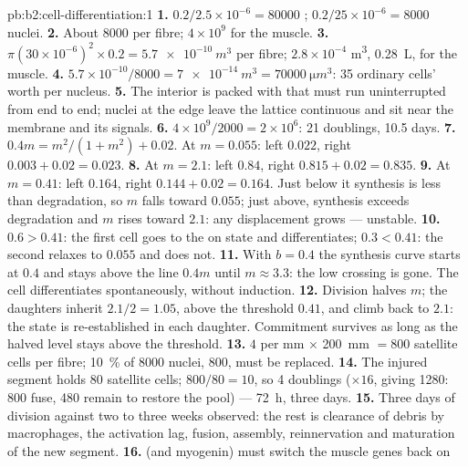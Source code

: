 \begin{solution}{pb:b2:cell-differentiation:1}
\textbf{1.} $0.2/2.5\times 10^{-6} = \num{80000}$ ;
$0.2/25\times 10^{-6} = \num{8000}$ nuclei.
\textbf{2.} About \num{8000} per fibre; $4\times 10^{9}$ for the
muscle.
\textbf{3.} $\pi(30\times 10^{-6})^{2}\times 0.2 = \qty{5.7e-10}{m^3}$
per fibre; $2.8\times 10^{-4}$ \unit{m^3}, \qty{0.28}{L}, for the
muscle.
\textbf{4.} $5.7\times 10^{-10}/8000 = \qty{7e-14}{m^3} =
\qty{70000}{\micro m^3}$: 35 ordinary cells' worth per nucleus.
\textbf{5.} The interior is packed with  that must run
uninterrupted from end to end; nuclei at the edge leave the lattice
continuous and sit near the membrane and its signals.
\textbf{6.} $4\times 10^{9}/2000 = 2\times 10^{6}$: 21 doublings, 10.5
days.
\textbf{7.} $0.4m = m^{2}/(1 + m^{2}) + 0.02$. At $m = 0.055$: left
$0.022$, right $0.003 + 0.02 = 0.023$.
\textbf{8.} At $m = 2.1$: left $0.84$, right $0.815 + 0.02 = 0.835$.
\textbf{9.} At $m = 0.41$: left $0.164$, right $0.144 + 0.02 = 0.164$.
Just below it synthesis is less than degradation, so $m$ falls
toward $0.055$; just above, synthesis exceeds degradation and $m$
rises toward $2.1$: any displacement grows --- unstable.
\textbf{10.} $0.6 > 0.41$: the first cell goes to the on state and
differentiates; $0.3 < 0.41$: the second relaxes to $0.055$ and
does not.
\textbf{11.} With $b = 0.4$ the synthesis curve starts at $0.4$ and
stays above the line $0.4m$ until $m \approx 3.3$: the low crossing
is gone. The cell differentiates spontaneously, without induction.
\textbf{12.} Division halves $m$; the daughters inherit $2.1/2 =
1.05$, above the threshold $0.41$, and climb back to $2.1$: the state
is re-established in each daughter. Commitment survives as long as
the halved level stays above the threshold.
\textbf{13.} $4$ per mm $\times$ \qty{200}{mm} $= 800$ satellite cells
per fibre; \qty{10}{\%} of \num{8000} nuclei, \num{800}, must be
replaced.
\textbf{14.} The injured segment holds $80$ satellite cells; $800/80 =
10$, so 4 doublings ($\times 16$, giving \num{1280}: 800 fuse, 480
remain to restore the pool) --- \qty{72}{h}, three days.
\textbf{15.} Three days of division against two to three weeks
observed: the rest is clearance of debris by macrophages, the
activation lag, fusion,  assembly, reinnervation and
maturation of the new segment.
\textbf{16.}  (and myogenin) must switch the muscle genes back on

\end{solution}
